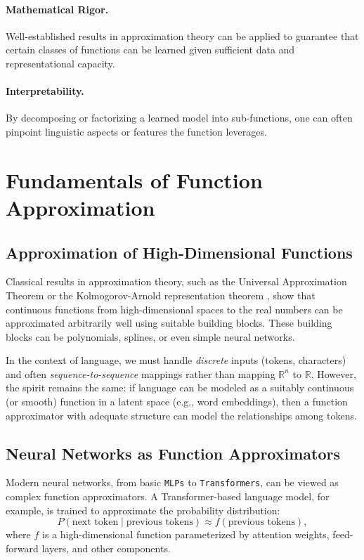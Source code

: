 \documentclass[11pt]{article}
\begin{document}
\paragraph{Mathematical Rigor.} Well-established results in approximation theory can be applied to guarantee that certain classes of functions can be learned given sufficient data and representational capacity.
\paragraph{Interpretability.} By decomposing or factorizing a learned model into sub-functions, one can often pinpoint linguistic aspects or features the function leverages.

\section{Fundamentals of Function Approximation}
\label{sec:function_approximation}

\subsection{Approximation of High-Dimensional Functions}
Classical results in approximation theory, such as the Universal Approximation Theorem \cite{Hornik1989} or the Kolmogorov-Arnold representation theorem \cite{Kolmogorov1957,Arnold1963}, show that continuous functions from high-dimensional spaces to the real numbers can be approximated arbitrarily well using suitable building blocks. These building blocks can be polynomials, splines, or even simple neural networks.

In the context of language, we must handle \emph{discrete} inputs (tokens, characters) and often \emph{sequence-to-sequence} mappings rather than mapping $\mathbb{R}^n$ to $\mathbb{R}$. However, the spirit remains the same: if language can be modeled as a suitably continuous (or smooth) function in a latent space (e.g., word embeddings), then a function approximator with adequate structure can model the relationships among tokens.

\subsection{Neural Networks as Function Approximators}
Modern neural networks, from basic \texttt{MLPs} to \texttt{Transformers}, can be viewed as complex function approximators. A Transformer-based language model, for example, is trained to approximate the probability distribution:
\[
P(\text{next token} \mid \text{previous tokens}) \approx f(\text{previous tokens}),
\]
where $f$ is a high-dimensional function parameterized by attention weights, feed-forward layers, and other components.
\end{document}
